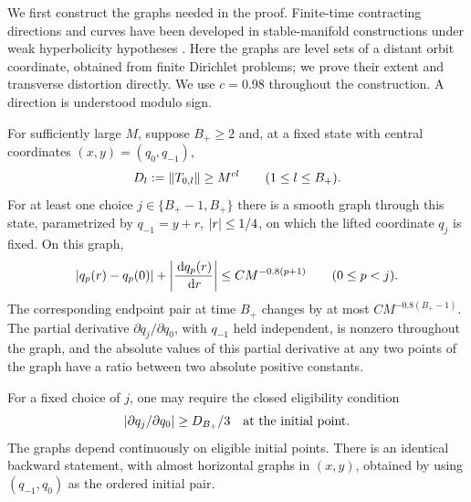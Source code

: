 We first construct the graphs needed in the proof. Finite-time
contracting directions and curves have been developed in stable-manifold
constructions under weak hyperbolicity hypotheses
\cite{HollandLuzzatto2006}. Here the graphs are
level sets of a distant orbit coordinate, obtained from finite
Dirichlet problems; we prove their extent and transverse distortion
directly. We use $c=0.98$ throughout the construction. A direction is
understood modulo sign.

\begin{lemma}
\label{bridge:graphs}
For sufficiently large $M$, suppose $B_+\geq2$ and, at a fixed state with central coordinates
$(x,y)=(q_0,q_{-1})$,
\begin{equation}
 D_l:=\left\lVert T_{0,l}\right\rVert\geq M^{cl}
 \qquad(1\leq l\leq B_+).
 \label{bridge:prefix-growth}
\end{equation}
For at least one choice $j\in\{B_+-1,B_+\}$ there is a smooth graph
through this state, parametrized by $q_{-1}=y+r$, $\left\lvert r\right\rvert\leq1/4$,
on which the lifted coordinate $q_j$ is fixed. On this graph,
\begin{equation}
 \left\lvert q_p(r)-q_p(0)\right\rvert+
 \left\lvert\frac{\,\mathrm{d} q_p(r)}{\,\mathrm{d} r}\right\rvert
 \leq C M^{-0.8(p+1)}
 \qquad(0\leq p<j).
 \label{bridge:graph-contraction}
\end{equation}
The corresponding endpoint pair at time $B_+$ changes by at most
$C M^{-0.8(B_+-1)}$. The partial derivative
$\partial q_j/\partial q_0$, with $q_{-1}$ held independent, is
nonzero throughout the graph, and the absolute values of this partial
derivative at any two points of the graph have a ratio between two
absolute positive constants.

For a fixed choice of $j$, one may require the closed eligibility
condition
\begin{equation}
 \left\lvert\partial q_j/\partial q_0\right\rvert\geq D_{B_+}/3
 \quad\text{at the initial point}.
 \label{bridge:row-choice}
\end{equation}
The graphs depend continuously on eligible initial points. There is
an identical backward statement, with almost horizontal graphs in
$(x,y)$, obtained by using $(q_{-1},q_0)$ as the ordered initial pair.
\end{lemma}

